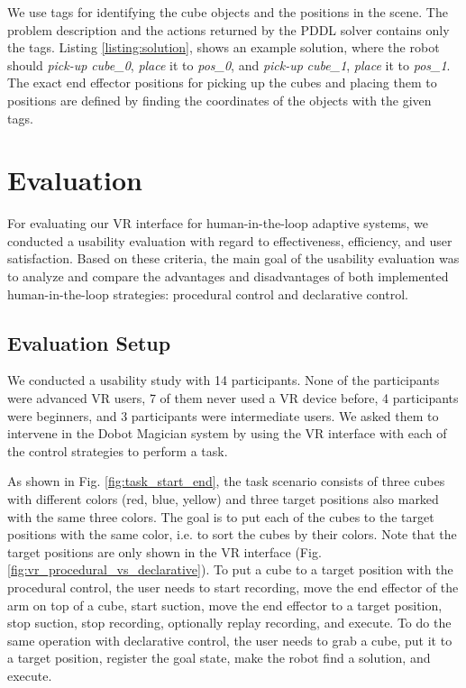 \documentclass[10pt, conference]{IEEEtran}
\begin{document}
We use tags for identifying the cube objects and the positions in the scene. The problem description and the actions returned by the PDDL solver contains only the tags. Listing \ref{listing:solution}, shows an example solution, where the robot should \textit{pick-up} \textit{cube\_0}, \textit{place} it to \textit{pos\_0}, and \textit{pick-up} \textit{cube\_1}, \textit{place} it to \textit{pos\_1}. The exact end effector positions for picking up the cubes and placing them to positions are defined by finding the coordinates of the objects with the given tags.

\section{Evaluation}
\label{eval}

For evaluating our VR interface for human-in-the-loop adaptive systems, we conducted a usability evaluation with regard to effectiveness, efficiency, and user satisfaction. Based on these criteria, the main goal of the usability evaluation was to analyze and compare the advantages and disadvantages of both implemented human-in-the-loop strategies: procedural control and declarative control. 

\subsection{Evaluation Setup}
\label{evalSetup}

We conducted a usability study with 14 participants. None of the participants were advanced VR users, 7 of them never used a VR device before, 4 participants were beginners, and 3 participants were intermediate users. We asked them to intervene in the Dobot Magician system by using the VR interface with each of the control strategies to perform a task.

As shown in Fig. \ref{fig:task_start_end}, the task scenario consists of three cubes with different colors (red, blue, yellow) and three target positions also marked with the same three colors. The goal is to put each of the cubes to the target positions with the same color, i.e. to sort the cubes by their colors. Note that the target positions are only shown in the VR interface (Fig. \ref{fig:vr_procedural_vs_declarative}). To put a cube to a target position with the procedural control, the user needs to start recording, move the end effector of the arm on top of a cube, start suction, move the end effector to a target position, stop suction, stop recording, optionally replay recording, and execute. To do the same operation with declarative control, the user needs to grab a cube, put it to a target position, register the goal state, make the robot find a solution, and execute.
\end{document}
